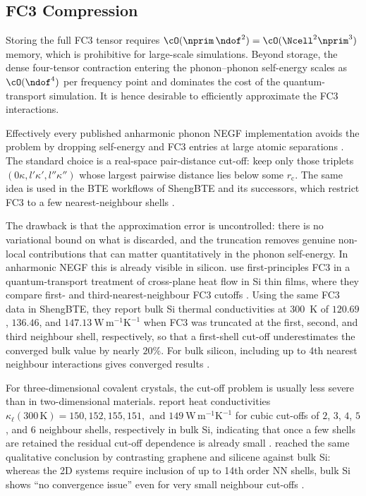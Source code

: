 \subsection{FC3 Compression}
\label{sub:fc3_compression}

Storing the full FC3 tensor requires $\cO(\nprim\,\ndof^{2}) = \cO(\Ncell^{2}\nprim^{3})$
memory, which is prohibitive for large-scale simulations. Beyond storage, the dense four-tensor
contraction entering the phonon--phonon self-energy scales as $\cO(\ndof^{4})$ per frequency
point and dominates the cost of the quantum-transport simulation. It is hence desirable to
efficiently approximate the FC3 interactions.

Effectively every published anharmonic phonon NEGF implementation avoids the problem by
dropping self-energy and FC3 entries at large atomic separations
\cite{guo_quantum_2020, guo_anharmonic_2021, luisier_atomistic_2012, li_anharmonic_2009,
      polanco_nonequilibrium_2021, mingo_anharmonic_2006}.
The standard choice is a real-space pair-distance cut-off: keep only those triplets
$(0\kappa, l'\kappa', l''\kappa'')$ whose largest pairwise distance lies below some
$r_\mathrm{c}$. The same idea is used in the BTE workflows of ShengBTE and its successors,
which restrict FC3 to a few nearest-neighbour shells \cite{li_shengbte_2014}.

The drawback is that the approximation error is uncontrolled: there is no variational bound
on what is discarded, and the truncation removes genuine non-local contributions that can
matter quantitatively in the phonon self-energy. In anharmonic NEGF this is already visible in
silicon. \citeauthor{guo_quantum_2020} use first-principles FC3 in a quantum-transport treatment
of cross-plane heat flow in Si thin films, where they compare first- and third-nearest-neighbour
FC3 cutoffs \cite{guo_quantum_2020}. Using the same FC3 data in ShengBTE, they report bulk Si
thermal conductivities at 300~K of $120.69$, $136.46$, and $147.13~\mathrm{W\,m^{-1}K^{-1}}$ when
FC3 was truncated at the first, second, and third neighbour shell, respectively, so that a
first-shell cut-off underestimates the converged bulk value by nearly $20\%$. For bulk silicon,
including up to 4th nearest neighbour interactions gives converged results
\cite{li_shengbte_2014, qin_accelerating_2018}.

For three-dimensional covalent crystals, the cut-off problem is usually less severe than in
two-dimensional materials. \citeauthor{mcgaughey_phonon_2019} report heat conductivities
$\kappa_\ell(300\,\mathrm{K}) = 150, 152, 155, 151,$ and $149~\mathrm{W\,m^{-1}K^{-1}}$ for
cubic cut-offs of $2$, $3$, $4$, $5$, and $6$ neighbour shells, respectively in bulk Si, indicating
that once a few shells are retained the residual cut-off dependence is already small
\cite{mcgaughey_phonon_2019}. \citeauthor{jiang_how_2022} reached the same qualitative conclusion
by contrasting graphene and silicene against bulk Si: whereas the 2D systems require inclusion of
up to 14th order NN shells, bulk Si shows ``no convergence issue'' even for very small neighbour
cut-offs \cite{jiang_how_2022}.

